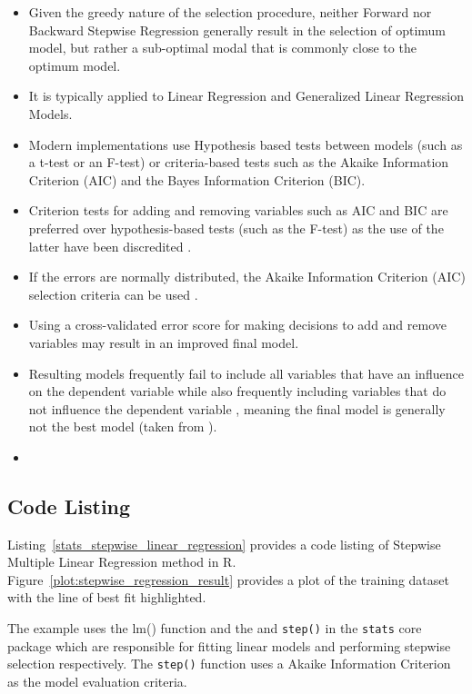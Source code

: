 \begin{itemize}
	\item Given the greedy nature of the selection procedure, neither Forward nor Backward Stepwise Regression generally result in the selection of optimum model, but rather a sub-optimal modal that is commonly close to the optimum model.
	\item It is typically applied to Linear Regression and Generalized Linear Regression Models.
	\item Modern implementations use Hypothesis based tests between models (such as a t-test or an F-test) or criteria-based tests such as the Akaike Information Criterion (AIC) and the Bayes Information Criterion (BIC).
	\item Criterion tests for adding and removing variables such as AIC and BIC are preferred over hypothesis-based tests (such as the F-test) as the use of the latter have been discredited \cite{Pope1972, Wilkinson1979}.
	\item If the errors are normally distributed, the Akaike Information Criterion (AIC) selection criteria can be used \cite{Akaike1973}.
	\item Using a cross-validated error score for making decisions to add and remove variables may result in an improved final model.
	\item Resulting models frequently fail to include all variables that have an influence on the dependent variable while also frequently including variables that do not influence the dependent variable \cite{Derksen1992}, meaning the final model is generally not the best model \cite{Miller1984} (taken from \cite{Mundry2009}).
	\item 
\end{itemize}

\subsection{Code Listing}
Listing~\ref{stats_stepwise_linear_regression} provides a code listing of Stepwise Multiple Linear Regression method in R. Figure~\ref{plot:stepwise_regression_result} provides a plot of the training dataset with the line of best fit highlighted.

The example uses the {lm()} function and the and \texttt{step()} in the \texttt{stats} core package which are responsible for fitting linear models and performing stepwise selection respectively. The \texttt{step()} function uses a Akaike Information Criterion as the model evaluation criteria.

